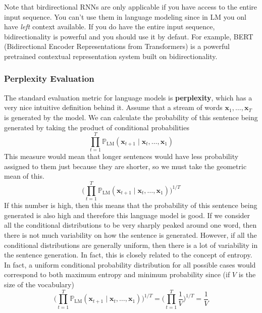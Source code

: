 \documentclass{article}
\begin{document}
      Note that birdirectional RNNs are only applicable if you have access to the entire input sequence. You can't use them in language modeling since in LM you onl have \textit{left} context available. If you do have the entire input sequence, bidirectionality is powerful and you should use it by defaut. For example, BERT (Bidirectional Encoder Representations from Transformers) is a powerful pretrained contextual representation system built on bidirectionality. 

    \subsubsection{Perplexity Evaluation} 

      The standard evaluation metric for language models is \textbf{perplexity}, which has a very nice intuitive definition behind it. Assume that a stream of words $\mathbf{x}_1, \ldots, \mathbf{x}_T$ is generated by the model. We can calculate the probability of this sentence being generated by taking the product of conditional probabilities 
      \begin{equation}
        \prod_{t=1}^T \mathbb{P}_{\mathrm{LM}} (\mathbf{x}_{t+1} \mid \mathbf{x}_t, \ldots, \mathbf{x}_1)
      \end{equation}
      This measure would mean that longer sentences would have less probability assigned to them just because they are shorter, so we must take the geometric mean of this. 
      \begin{equation}
        \bigg( \prod_{t=1}^T \mathbb{P}_{\mathrm{LM}} (\mathbf{x}_{t+1} \mid \mathbf{x}_t, \ldots, \mathbf{x}_1) \bigg)^{1/T}
      \end{equation}
      If this number is high, then this means that the probability of this sentence being generated is also high and therefore this language model is good. If we consider all the conditional distributions to be very sharply peaked around one word, then there is not much variability on how the sentence is generated. However, if all the conditional distributions are generally uniform, then there is a lot of variability in the sentence generation. In fact, this is closely related to the concept of entropy. In fact, a uniform conditional probability distribution for all possible cases would correspond to both maximum entropy and minimum probability since (if $V$ is the size of the vocabulary)
      \begin{equation}
        \bigg( \prod_{t=1}^T \mathbb{P}_{\mathrm{LM}} (\mathbf{x}_{t+1} \mid \mathbf{x}_t, \ldots, \mathbf{x}_1) \bigg)^{1/T} = \bigg( \prod_{t=1}^T \frac{1}{V} \bigg)^{1/T} = \frac{1}{V}
      \end{equation}
\end{document}
